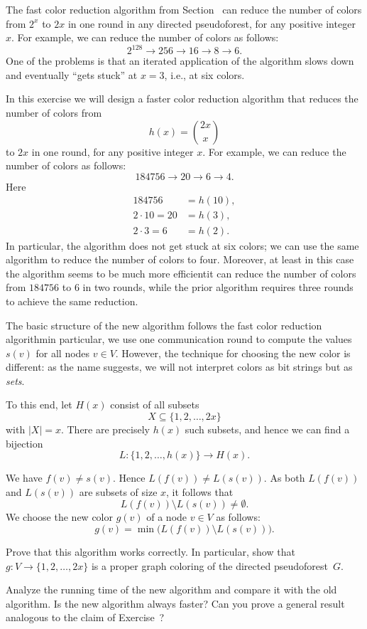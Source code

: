 \begin{exs}\label{ex:dpset}
    The fast color reduction algorithm from Section~ can reduce the number of colors from $2^x$ to $2x$ in one round in any directed pseudoforest, for any positive integer $x$. For example, we can reduce the number of colors as follows:
    \[
        2^{128} \to 256 \to 16 \to 8 \to 6.
    \]
    One of the problems is that an iterated application of the algorithm slows down and eventually ``gets stuck'' at $x = 3$, i.e., at six colors.
    
    In this exercise we will design a faster color reduction algorithm that reduces the number of colors from
    \[
        h(x) = \binom{2x}{x}
    \]
    to $2x$ in one round, for any positive integer $x$. For example, we can reduce the number of colors as follows:
    \[
        184756 \to 20 \to 6 \to 4.
    \]
    Here
    \begin{align*}
        184756 &= h(10), \\
        2 \cdot 10 = 20 &= h(3), \\
        2 \cdot 3 = 6 &= h(2).
    \end{align*}
    In particular, the algorithm does not get stuck at six colors; we can use the same algorithm to reduce the number of colors to four. Moreover, at least in this case the algorithm seems to be much more efficient\mydash it can reduce the number of colors from $184756$ to $6$ in two rounds, while the prior algorithm requires three rounds to achieve the same reduction.
    
    The basic structure of the new algorithm follows the fast color reduction algorithm\mydash in particular, we use one communication round to compute the values $s(v)$ for all nodes $v \in V$. However, the technique for choosing the new color is different: as the name suggests, we will not interpret colors as bit strings but as \emph{sets}.
    
    To this end, let $H(x)$ consist of all subsets
    \[
        X \subseteq \{1,2,\dotsc,2x\}
    \]
    with $|X| = x$. There are precisely $h(x)$ such subsets, and hence we can find a bijection
    \[
        L\colon \{1,2,\dotsc,h(x)\} \to H(x).
    \]
    
    We have $f(v) \ne s(v)$. Hence $L(f(v)) \ne L(s(v))$. As both $L(f(v))$ and $L(s(v))$ are subsets of size $x$, it follows that
    \[
        L(f(v)) \setminus L(s(v)) \ne \emptyset.
    \]
    We choose the new color $g(v)$ of a node $v \in V$ as follows:
    \[
        g(v) = \min \bigl( L(f(v)) \setminus L(s(v)) \bigr).
    \]

    Prove that this algorithm works correctly. In particular, show that $g\colon V \to \{1,2,\dotsc,2x\}$ is a proper graph coloring of the directed pseudoforest~$G$.
    
    Analyze the running time of the new algorithm and compare it with the old algorithm. Is the new algorithm always faster? Can you prove a general result analogous to the claim of Exercise~?
\end{exs}


